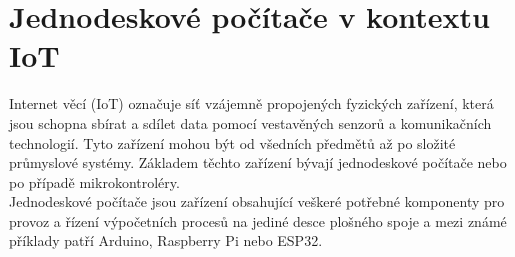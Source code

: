 
\section{Jednodeskové počítače v kontextu IoT}
Internet věcí (IoT) označuje síť vzájemně propojených fyzických zařízení, která jsou schopna sbírat a sdílet data pomocí vestavěných senzorů a komunikačních technologií. Tyto zařízení mohou být od všedních předmětů až po složité průmyslové systémy.
Základem těchto zařízení bývají jednodeskové počítače nebo po případě mikrokontroléry.\\
Jednodeskové počítače jsou zařízení obsahující veškeré potřebné komponenty pro provoz a řízení výpočetních procesů na jediné desce plošného spoje a mezi známé příklady patří Arduino, Raspberry Pi nebo ESP32.



